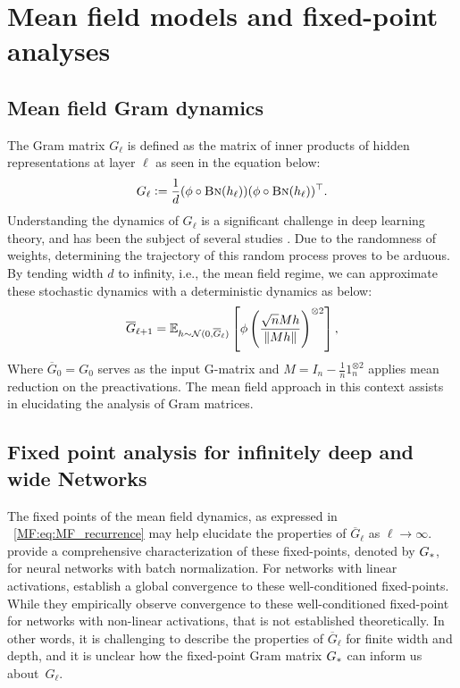 \section{Mean field models and fixed-point analyses}
\subsection{Mean field Gram dynamics}
The Gram matrix $G_\ell$ is defined as the matrix of inner products of hidden representations at layer $\ell$ as seen in the equation below:
\begin{align}\label{MF:eq:gram_matrix}
G_\ell := \frac1d (\phi\circ\text{\sc{Bn}}(h_\ell))(\phi\circ\text{\sc{Bn}}(h_\ell))^{\top}.
\end{align}
Understanding the dynamics of $G_\ell$ is a significant challenge in deep learning theory, and has been the subject of several studies \cite{yang2018a,pennington2018emergence,pennington2017nonlinear}. Due to the randomness of weights, determining the trajectory of this random process proves to be arduous. By tending width $d$ to infinity, i.e., the mean field regime, we can approximate these stochastic dynamics with a deterministic dynamics as below:
\begin{align}\label{MF:eq:MF_recurrence}
\overline{G}_{\ell+1} = \mathbb{E}_{h\sim \mathcal{N}(0,\overline{G}_\ell)}\left[\phi\left(\frac{ \sqrt{n} M h}{\| Mh\|}\right)^{\otimes 2}\right],
\end{align}
Where $\overline{G}_{0} = G_0$ serves as the input G-matrix and ${M = I_n - \frac1n1_n^{\otimes 2}}$ applies mean reduction on the preactivations. The mean field approach in this context assists in elucidating the analysis of Gram matrices.

\subsection{Fixed point analysis for infinitely deep and wide Networks}
The fixed points of the mean field dynamics, as expressed in ~\eqref{MF:eq:MF_recurrence} may help elucidate the properties of $\overline{G}_{\ell}$ as $\ell \to \infty$. 
\citet{yang2018a} provide a comprehensive characterization of these fixed-points, denoted by ${G_*}$, for neural networks with batch normalization. For networks with linear activations, \citet{yang2018a} establish a global convergence to these well-conditioned fixed-points. While they empirically observe convergence to these well-conditioned fixed-point for networks with non-linear activations, that is not established theoretically. In other words, it is challenging to describe the properties of $\overline{G}_\ell$ for finite width and depth, and it is unclear how the fixed-point Gram matrix ${G_*}$ can inform us about~$G_\ell$.

